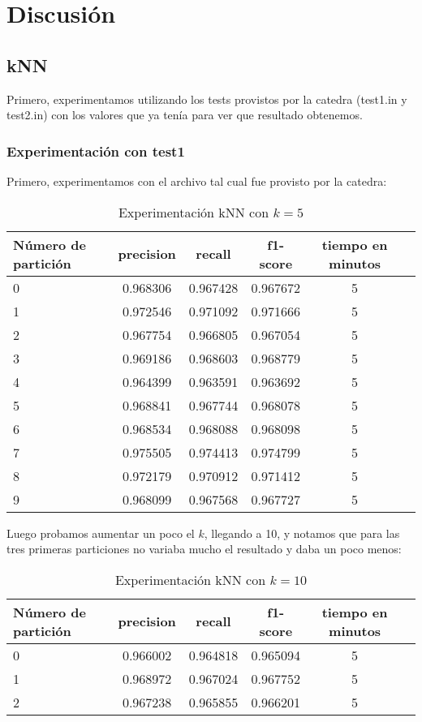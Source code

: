 \section{Discusi\'on}

\subsection{kNN}

Primero, experimentamos utilizando los tests provistos por la catedra (test1.in y test2.in) con los valores que ya ten\'ia para ver que resultado obtenemos.

\subsubsection{Experimentaci\'on con test1}

Primero, experimentamos con el archivo tal cual fue provisto por la catedra:

\begin{table}[H]
\centering
\begin{tabular}{| l | c | c | c | c | c |}
\hline
N\'umero de partici\'on & precision & recall & f1-score & tiempo en minutos \\
\hline

0 & 0.968306 & 0.967428 & 0.967672 & 5 \\
1 & 0.972546 & 0.971092 & 0.971666 & 5 \\
2 & 0.967754 & 0.966805 & 0.967054 & 5 \\
3 & 0.969186 & 0.968603 & 0.968779 & 5 \\
4 & 0.964399 & 0.963591 & 0.963692 & 5 \\
5 & 0.968841 & 0.967744 & 0.968078 & 5 \\
6 & 0.968534 & 0.968088 & 0.968098 & 5 \\
7 & 0.975505 & 0.974413 & 0.974799 & 5 \\
8 & 0.972179 & 0.970912 & 0.971412 & 5 \\
9 & 0.968099 & 0.967568 & 0.967727 & 5 \\

\hline
\end{tabular}
\caption{Experimentaci\'on kNN con $k=5$}
\end{table}

Luego probamos aumentar un poco el $k$, llegando a 10, y notamos que para las tres primeras particiones no variaba mucho el resultado y daba un poco menos:

\begin{table}[H]
\centering
\begin{tabular}{| l | c | c | c | c | c |}
\hline
N\'umero de partici\'on & precision & recall & f1-score & tiempo en minutos \\
\hline

0 & 0.966002 & 0.964818 & 0.965094 & 5 \\
1 & 0.968972 & 0.967024 & 0.967752 & 5 \\
2 & 0.967238 & 0.965855 & 0.966201 & 5 \\

\hline
\end{tabular}
\caption{Experimentaci\'on kNN con $k=10$}
\end{table}

